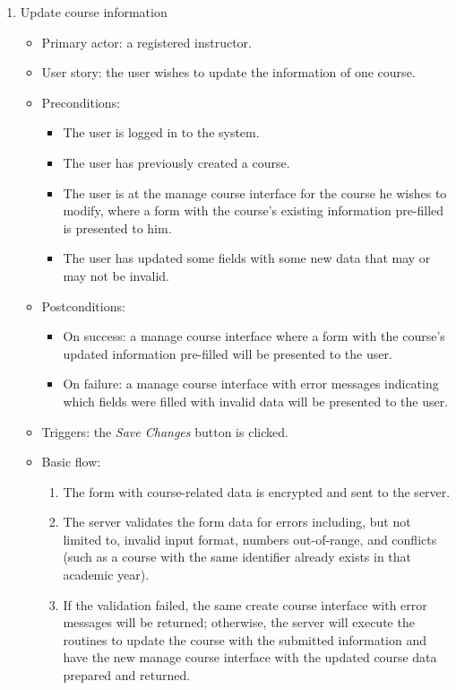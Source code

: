 \begin{enumerate}
\item Update course information
\begin{itemize}
    \item Primary actor: a registered instructor.
    \item User story: the user wishes to update the information of one course.
    \item Preconditions:
        \begin{itemize}
            \item The user is logged in to the system.
            \item The user has previously created a course.
            \item The user is at the manage course interface for the course he
                wishes to modify, where a form with
                the course's existing information pre-filled is presented to
                him.
            \item The user has updated some fields with some new data that may
                or may not be invalid.
        \end{itemize}
    \item Postconditions:
        \begin{itemize}
            \item On success: a manage course interface where a form with
                the course's updated information pre-filled will be presented
                to the user.
            \item On failure: a manage course interface with error messages
                indicating which fields were filled with invalid data will be
                presented to the user.
        \end{itemize}
    \item Triggers: the \emph{Save Changes} button is clicked.
    \item Basic flow:
        \begin{enumerate}
            \item The form with course-related data is encrypted and sent to
                the server.
            \item The server validates the form data for errors including,
                but not limited to, invalid input format, numbers out-of-range,
                and conflicts (such as a course with the same identifier  
                already exists in that academic year).
            \item If the validation failed, the same create course interface
                with error messages will be returned; otherwise, the server will
                execute the routines to update the course with the submitted 
                information and have the new manage course interface with the
                updated course data prepared and returned.
        \end{enumerate}
\end{itemize}


\end{enumerate}
